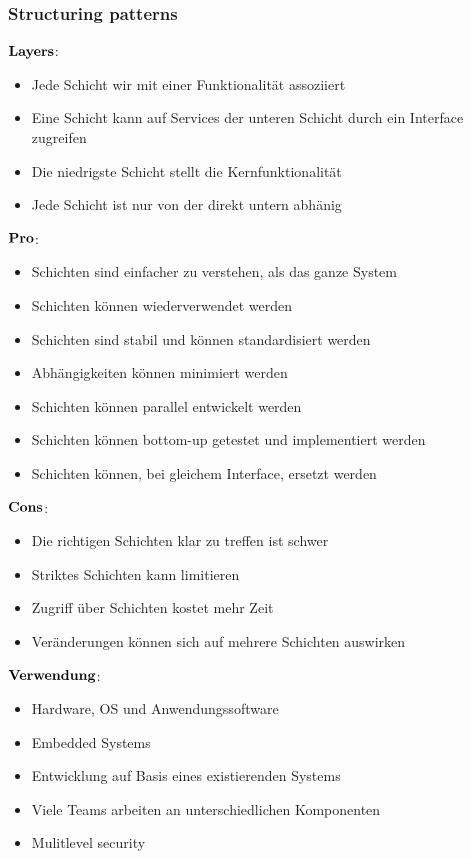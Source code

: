 \subsubsection{Structuring patterns}
$\bold{Layers}$:
\begin{itemize}
	\item Jede Schicht wir mit einer Funktionalität assoziiert
	\item Eine Schicht kann auf Services der unteren Schicht durch ein Interface zugreifen
	\item Die niedrigste Schicht stellt die Kernfunktionalität
	\item Jede Schicht ist nur von der direkt untern abhänig
\end{itemize}
\begin{multicols}{2}
$\bold{Pro}$:
\begin{itemize}
	\item Schichten sind einfacher zu verstehen, als das ganze System
	\item Schichten können wiederverwendet werden
	\item Schichten sind stabil und können standardisiert werden
	\item Abhängigkeiten können minimiert werden
	\item Schichten können parallel entwickelt werden
	\item Schichten können bottom-up getestet und implementiert werden
	\item Schichten können, bei gleichem Interface, ersetzt werden 
\end{itemize}
\columnbreak
$\bold{Cons}$:
\begin{itemize}
	\item Die richtigen Schichten klar zu treffen ist schwer
	\item Striktes Schichten kann limitieren 
	\item Zugriff über Schichten kostet mehr Zeit
	\item Veränderungen können sich auf mehrere Schichten auswirken
\end{itemize}
\end{multicols}
$\bold{Verwendung}$:
\begin{itemize}
	\item Hardware, OS und Anwendungssoftware
	\item Embedded Systems
	\item Entwicklung auf Basis eines existierenden Systems
	\item Viele Teams arbeiten an unterschiedlichen Komponenten
	\item Mulitlevel security
\end{itemize}
